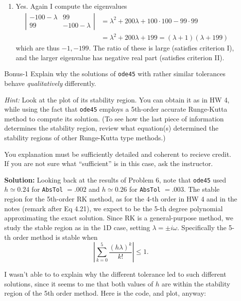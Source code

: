 \documentclass[11pt]{article}
\def\f{\frac }
\begin{document}
\begin{enumerate}
\begin{enumerate}
\item Yes. Again I compute the eigenvalues
\begin{align*} \left | \begin{array}{cc} -100 -\lambda & 99\\ 99 & -100 - \lambda \end{array} \right | &= \lambda ^2 + 200 \lambda + 100\cdot 100 - 99 \cdot 99\\
&= \lambda ^2 + 200 \lambda +199 = (\lambda +1)(\lambda + 199)\end{align*}
which are thus $-1,-199$.
The ratio of these is large (satisfies criterion I), and the larger eigenvalue has negative real part (satisfies criterion II).

\end{enumerate}




\clearpage
\pagebreak
\item[Bonus-1] Explain why the solutions of \verb|ode45| with rather similar tolerances behave {\em qualitatively} differently.

{\em Hint:} Look at the plot of its stability region. You can obtain it as in HW 4, while using the fact that \verb|ode45| employs a 5th-order accurate Runge-Kutta method to compute its solution. (To see how the last piece of information determines the stability region, review what equation(s) determined the stability regions of other Runge-Kutta type methods.)

You explanation must be sufficiently detailed and coherent to recieve credit. If you are not sure what ``sufficient'' is in this case, ask the instructor.


\bigskip
\textbf{Solution:}  Looking back at the results of Problem 6, note that \verb|ode45| used $h \simeq 0.24$ for \verb|AbsTol| $=.002$ and $h \simeq 0.26$ for \verb|AbsTol| $=.003$.
The stable region for the 5th-order RK method, as for the 4-th order in HW 4 and in the notes (remark after Eq 4.21), we expect to be the 5-th degree polynomial approximating the exact solution.
Since RK is a general-purpose method, we study the stable region as in the 1D case, setting $\lambda  = \pm i \omega$.
Specifically the 5-th order method is stable when
\begin{equation} \left | \sum _{k=0} ^5 \f{(h\lambda) ^k}{k!} \right | \leq 1 .\end{equation}

I wasn't able to to explain why the different tolerance led to such different solutions, since it seems to me that both values of $h$ are within the stability region of the 5th order method.
Here is the code, and plot, anyway:


\end{enumerate}
\end{document}
